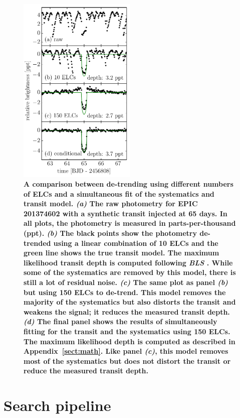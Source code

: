 \documentclass[12pt,preprint]{aastex}
\newcommand{\project}[1]{\textsl{#1}} %
\newcommand{\figlabel}[1]{\label{fig:#1}}
\newcommand{\App}[1]{Appendix~\ref{sect:#1}}
\newcommand{\app}[1]{\App{#1}}
\newcommand{\sectlabel}[1]{\label{sect:#1}}
\newcommand{\response}[1]{{\color{mygreen} {\bf #1}}}
\begin{document}
\begin{figure}[p]
\begin{center}
\includegraphics[width=0.5\textwidth]{figures/overfitting.pdf}
\end{center}
\caption{%
\response{%
A comparison between de-trending using different numbers of ELCs and a
simultaneous fit of the systematics and transit model.
\emph{(a)} The raw photometry for EPIC 201374602 with a synthetic transit
injected at 65 days. In all plots, the photometry is measured in
parts-per-thousand (ppt).
\emph{(b)} The black points show the photometry de-trended using a linear
combination of 10 ELCs and the green line shows the true transit model.
The maximum likelihood transit depth is computed following \project{BLS}
\citep{Kovacs:2002}.
While some of the systematics are removed by this model, there is still a lot
of residual noise.
\emph{(c)} The same plot as panel \emph{(b)} but using 150 ELCs to de-trend.
This model removes the majority of the systematics but also distorts the
transit and weakens the signal; it reduces the measured transit depth.
\emph{(d)} The final panel shows the results of simultaneously fitting for
the transit and the systematics using 150 ELCs.
The maximum likelihood depth is computed as described in \app{math}.
Like panel \emph{(c)}, this model removes most of the systematics but does
not distort the transit or reduce the measured transit depth.
}
\figlabel{overfitting}}
\end{figure}


\section{Search pipeline}
\sectlabel{search}
\end{document}
